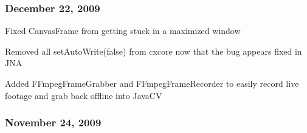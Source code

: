 \subsubsection*{December 22, 2009}


\begin{DoxyItemize}
\item Fixed {\ttfamily Canvas\+Frame} from getting stuck in a maximized window
\item Removed all {\ttfamily set\+Auto\+Write(false)} from {\ttfamily cxcore} now that the bug appears fixed in J\+N\+A
\item Added {\ttfamily F\+Fmpeg\+Frame\+Grabber} and {\ttfamily F\+Fmpeg\+Frame\+Recorder} to easily record live footage and grab back offline into Java\+C\+V
\end{DoxyItemize}

\subsubsection*{November 24, 2009}


